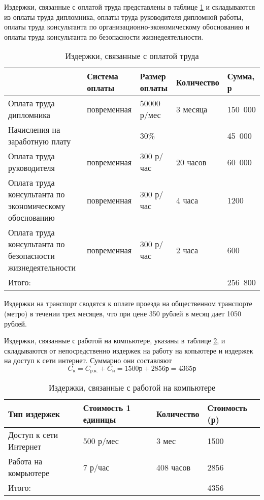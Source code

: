 Издержки, связанные с оплатой труда представлены в таблице \ref{costs-salary}
и складываются из оплаты труда дипломника, оплаты труда руководителя дипломной работы, оплаты труда консультанта по организационно-экономическому обоснованию и оплаты труда консультанта по безопасности жизнедеятельности.

\begin{table}
\center
\caption{Издержки, связанные с оплатой труда}
\label{costs-salary}
\begin{tabular}{|p{4cm}|p{3cm}|p{2cm}|p{2.5cm}|p{2cm}|}
\hline 
 & Система оплаты & Размер оплаты & Количество & Сумма, р \\ 
\hline 
Оплата труда дипломника & повременная & 50000 р/мес & 3 месяца & 150~000 \\ 
\hline
Начисления на заработную плату &  & 30\% & & 45~000\\ 
\hline 
Оплата труда руководителя & повременная & 300 р/час & 20 часов & 60~000 \\ 
\hline 
Оплата труда консультанта по экономическому обоснованию & повременная & 300 р/час & 4 часа & 1200 \\ 
\hline 
Оплата труда консультанта по безопасности жизнедеятельности & повременная & 300 р/час & 2 часа & 600 \\ 
\hline 
Итого:  &  &  &  & 256~800 \\ 
\hline 
\end{tabular}
\end{table}

Издержки на транспорт сводятся к оплате проезда на общественном транспорте (метро) в течении трех месяцев, что при цене 350 рублей в месяц дает 1050 рублей.

Издержки, связанные с работой на компьютере, указаны в таблице \ref{costs-computer},
и складываются от непосредственно издержек на работу на копьютере и издержек на 
доступ к сети интернет. Суммарно они составляют
$$ C_{к}= C_{р.к.} + C_{и} = 1500 р + 2856 р = 4365 р $$

\begin{table}
\center
\caption{Издержки, связанные с работой на компьютере}
\label{costs-computer}
\begin{tabular}{|p{3cm}|p{3cm}|p{3cm}|p{3cm}|}
\hline 
Тип издержек & Стоимость 1 единицы & Количество & Стоимость (р) \\ 
\hline 
Доступ к сети Интернет & 500 р/мес & 3 мес & 1500 \\ 
\hline
Работа на комрьютере & 7 р/час & 408 часов & 2856\\ 
\hline 
Итого:  &  &  & 4356 \\ 
\hline
\end{tabular}
\end{table}

